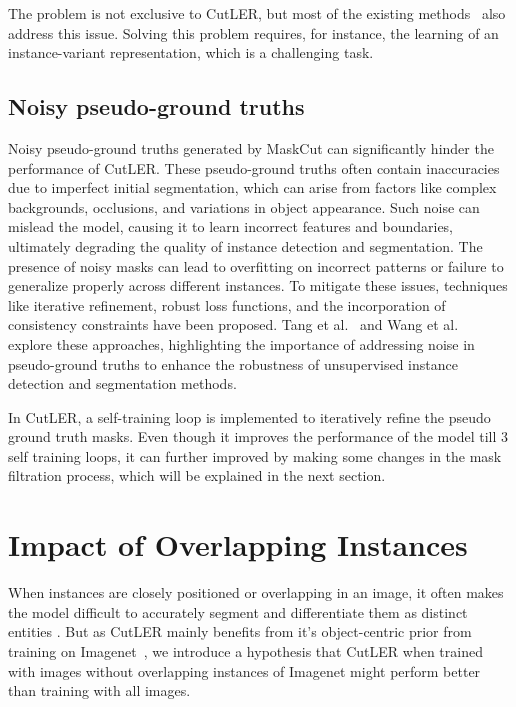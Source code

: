 The problem is not exclusive to CutLER, but most of the existing methods~\cite{engstler2023understanding, cond1_support_2, Wang_2022_CVPR} also address this issue. Solving this problem requires, for instance, the learning of an instance-variant representation, which is a challenging task.

\subsection{Noisy pseudo-ground truths}
Noisy pseudo-ground truths generated by MaskCut can significantly hinder the performance of CutLER. These pseudo-ground truths often contain inaccuracies due to imperfect initial segmentation, which can arise from factors like complex backgrounds, occlusions, and variations in object appearance. Such noise can mislead the model, causing it to learn incorrect features and boundaries, ultimately degrading the quality of instance detection and segmentation. The presence of noisy masks can lead to overfitting on incorrect patterns or failure to generalize properly across different instances. To mitigate these issues, techniques like iterative refinement, robust loss functions, and the incorporation of consistency constraints have been proposed. Tang et al.~\cite{Tang_2018_CVPR} and Wang et al.~\cite{ziegler2022selfsupervisedlearningobjectparts} explore these approaches, highlighting the importance of addressing noise in pseudo-ground truths to enhance the robustness of unsupervised instance detection and segmentation methods.

In CutLER, a self-training loop is implemented to iteratively refine the pseudo ground truth masks. Even though it improves the performance of the model till 3 self training loops, it can further improved by making some changes in the mask filtration process, which will be explained in the next section.

\section{Impact of Overlapping Instances}
\label{section:analysis_ol_instancs}
When instances are closely positioned or overlapping in an image, it often makes the model difficult to accurately segment and differentiate them as distinct entities \cite{kara2022image}. But as CutLER mainly benefits from it's object-centric prior from training on Imagenet~\cite{engstler2023understanding}, we introduce a hypothesis that CutLER when trained with images without overlapping instances of Imagenet might perform better than training with all images.

